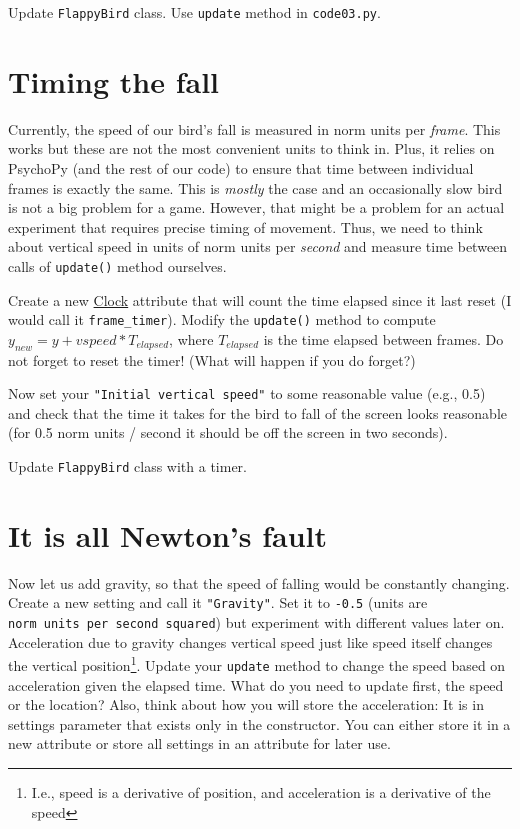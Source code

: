 \documentclass[
]{book}
\begin{document}
Update \texttt{FlappyBird} class.
Use \texttt{update} method in \texttt{code03.py}.

\hypertarget{timing-the-fall}{%
\section{Timing the fall}\label{timing-the-fall}}

Currently, the speed of our bird's fall is measured in norm units per \emph{frame}. This works but these are not the most convenient units to think in. Plus, it relies on PsychoPy (and the rest of our code) to ensure that time between individual frames is exactly the same. This is \emph{mostly} the case and an occasionally slow bird is not a big problem for a game. However, that might be a problem for an actual experiment that requires precise timing of movement. Thus, we need to think about vertical speed in units of norm units per \emph{second} and measure time between calls of \texttt{update()} method ourselves.

Create a new \href{https://psychopy.org/api/clock.html\#psychopy.clock.Clock}{Clock} attribute that will count the time elapsed since it last reset (I would call it \texttt{frame\_timer}). Modify the \texttt{update()} method to compute \(y_{new} = y + vspeed * T_{elapsed}\), where \(T_{elapsed}\) is the time elapsed between frames. Do not forget to reset the timer! (What will happen if you do forget?)

Now set your \texttt{"Initial\ vertical\ speed"} to some reasonable value (e.g., 0.5) and check that the time it takes for the bird to fall of the screen looks reasonable (for 0.5 norm units / second it should be off the screen in two seconds).

Update \texttt{FlappyBird} class with a timer.

\hypertarget{it-is-all-newtons-fault}{%
\section{It is all Newton's fault}\label{it-is-all-newtons-fault}}

Now let us add gravity, so that the speed of falling would be constantly changing. Create a new setting and call it \texttt{"Gravity"}. Set it to \texttt{-0.5} (units are \texttt{norm\ units\ per\ second\ squared}) but experiment with different values later on. Acceleration due to gravity changes vertical speed just like speed itself changes the vertical position\footnote{I.e., speed is a derivative of position, and acceleration is a derivative of the speed}. Update your \texttt{update} method to change the speed based on acceleration given the elapsed time. What do you need to update first, the speed or the location? Also, think about how you will store the acceleration: It is in settings parameter that exists only in the constructor. You can either store it in a new attribute or store all settings in an attribute for later use.
\end{document}
